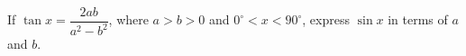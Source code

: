 If $\tan x=\dfrac{2ab}{a^2-b^2}$, where $a>b>0$ and $0^\circ<x<90^\circ$, express $\sin x$ in terms of $a$ and $b$.
